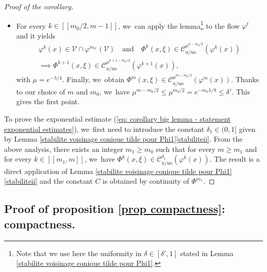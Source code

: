 \documentclass[JEP,XML,SOM,Unicode,NoEqCountersInSection,NoFloatCountersInSection,published]{cedram}
\newcommand{\lcr}{[\![}
\newcommand{\rcr}{]\!]}
\newcommand{\rs}{\mathrm{s}}
\newcommand{\rso}{\mathrm{so}}
\newcommand{\ru}{\mathrm{u}}
\newcommand{\ruo}{\mathrm{uo}}
\theoremstyle{definition}
\theoremstyle{plain}
\newcommand{\Ccal}{\mathcal{C}}
\newcommand{\Vcal}{\mathcal{V}}
\begin{document}
\begin{proof}[Proof of the corollary]
\begin{itemize}
\[\]
then we get $\delta_{m_0/2} = 1$,
\[
\Phi^{m_0/2} (x,\xi) \notin \overline{\Ccal_{\rso/\rs}^{1} (\varphi^{m_0/2} (x))} \quad\text{and thus } \Phi^{m_0/2} (x,\xi) \in \Ccal_{\ru/\ruo}^{1} (\varphi^{m_0/2} (x)).
\]
\item For every $k\in\lcr m_0/2,m-1\rcr$, we~can apply the lemma\footnote{Note that we use here the uniformity in $\delta \in [\delta', 1]$ stated in Lemma \ref{stabilite voisinage conique tilde pour Phi1}.} to the flow $\varphi^t$ and it yields
\begin{multline*}
\varphi^k (x) \in \Vcal \cap \varphi^{m_{\delta'}} (\Vcal) \quad \text{and} \quad \Phi^k (x,\xi) \in \Ccal_{\ru/\ruo}^{\mu^{k-m_0/2}} (\varphi^k (x)) \\
\implies \Phi^{k+1}(x,\xi) \in \Ccal_{\ru/\ruo}^{\mu^{k+1-m_0/2}} (\varphi^{k+1} (x)),
\end{multline*}
with $\mu = e^{-\lambda/4}$. Finally, we~obtain
$ \Phi^{m}(x,\xi) \in \Ccal_{\ru/\ruo}^{\mu^{m - m_0/2}} (\varphi^{m} (x)).$ Thanks to our choice of $m$ and $m_0$, we~have $\mu^{m - m_0/2} \leq \mu^{m_0/2} = e^{-m_0 \lambda /8} \leq \delta'$. This gives the first point.
\end{itemize}

To prove the exponential estimate (\ref{eq: corollary big lemma - statement exponential estimates}), we~first need to introduce the constant $\delta_1\in(0,1]$ given by  Lemma \ref{stabilite voisinage conique tilde pour Phi1}\eqref{stabiliteii}. From the above analysis, there exists an integer $m_1 \geq m_0$ such that for every $m \geq m_1$ and for every $k\in\lcr m_1,m\rcr$, we~have $ \Phi^k (x,\xi) \in \Ccal_{\ru/\ruo}^{\delta_1} (\varphi^k (x))$. The result is a direct application of Lemma \ref{stabilite voisinage conique tilde pour Phi1}\eqref{stabiliteii} and the constant $C$ is obtained by continuity of $\Phi^{m_1}$.
\end{proof}

\subsection{Proof of proposition \ref{prop compactness}: compactness.}
\label{subsection: proof compactness result}
\end{document}
